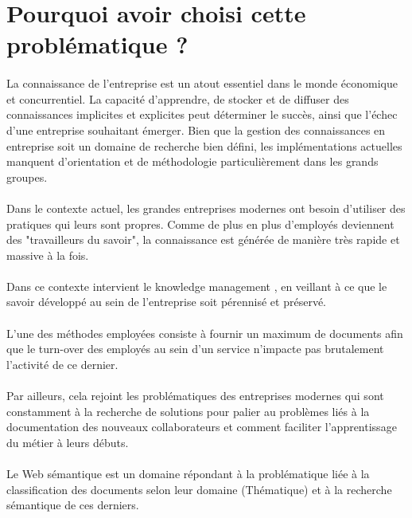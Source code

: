 \documentclass[12pt, a4paper, oneside]{book}
\begin{document}
\pagebreak

\section{Pourquoi avoir choisi cette problématique ?}

\paragraph{}
La connaissance de l'entreprise est un atout essentiel dans le monde économique et concurrentiel.
La capacité d'apprendre, de stocker et de diffuser des connaissances implicites et explicites peut déterminer le succès, ainsi que l'échec d'une entreprise souhaitant émerger. Bien que la gestion des connaissances en entreprise soit un domaine de recherche bien défini, les implémentations actuelles manquent d'orientation et  de méthodologie particulièrement dans les grands groupes.
\paragraph{}
Dans le contexte actuel, les grandes entreprises modernes ont besoin d'utiliser des pratiques qui leurs sont propres.
Comme de plus en plus d'employés deviennent des "travailleurs du savoir",
la connaissance est générée de manière très rapide et massive à la fois.
\paragraph{}
Dans ce contexte intervient le knowledge management , en veillant à ce que le savoir développé au sein de l'entreprise soit pérennisé et préservé.
\paragraph{}
L'une des méthodes employées consiste à fournir un maximum de documents afin que le turn-over des employés au sein d'un service n'impacte pas brutalement l'activité de ce dernier.
\paragraph{}
Par ailleurs, cela rejoint les problématiques des entreprises modernes qui sont constamment à la recherche de solutions pour palier au problèmes liés à la documentation des nouveaux collaborateurs et comment faciliter l'apprentissage du métier à leurs débuts.
\paragraph{}
Le Web sémantique est un domaine répondant à la problématique liée à la classification des documents selon leur domaine (Thématique) et à la recherche sémantique de ces derniers.
\end{document}
